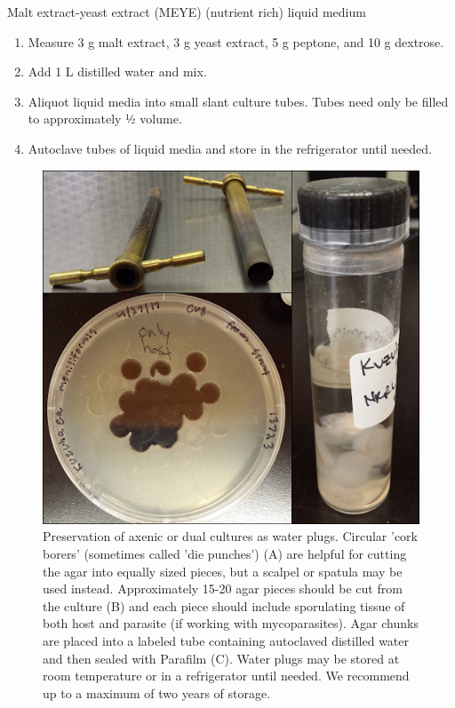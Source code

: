 \documentclass[]{book}
\providecommand{\tightlist}{%
  \setlength{\itemsep}{0pt}\setlength{\parskip}{0pt}}
\begin{document}
{Malt extract-yeast extract (MEYE) (nutrient rich) liquid medium}

\begin{enumerate}
\def\labelenumi{\arabic{enumi}.}
\tightlist
\item
  Measure 3 g malt extract, 3 g yeast extract, 5 g peptone, and 10 g dextrose.
\item
  Add 1 L distilled water and mix.
\item
  Aliquot liquid media into small slant culture tubes. Tubes need only be filled to approximately ½ volume.
\item
  Autoclave tubes of liquid media and store in the refrigerator until needed.
\end{enumerate}

\begin{figure}

{\centering \includegraphics[width=6.83in]{img/SupFig1_Ch2} 

}

\caption{Preservation of axenic or dual cultures as water plugs.  Circular 'cork borers' (sometimes called 'die punches') (A) are helpful for cutting the agar into equally sized pieces, but a scalpel or spatula may be used instead.  Approximately 15-20 agar pieces should be cut from the culture (B) and each piece should include sporulating tissue of both host and parasite (if working with mycoparasites).  Agar chunks are placed into a labeled tube containing autoclaved distilled water and then sealed with Parafilm (C).  Water plugs may be stored at room temperature or in a refrigerator until needed. We recommend up to a maximum of two years of storage.}\label{fig:ch2supfig1}
\end{figure}
\end{document}
